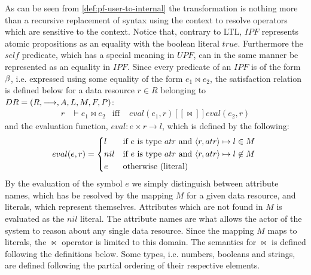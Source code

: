 As can be seen from \autoref{def:pf-user-to-internal} the transformation is nothing more than a recursive replacement of syntax using the context to resolve operators which are sensitive to the context. Notice that, contrary to LTL, $IPF$ represents atomic propositions as an equality with the boolean literal $true$. Furthermore the $self$ predicate, which has a special meaning in $UPF$, can in the same manner be represented as an equality in $IPF$. Since every predicate of an $IPF$ is of the form $\beta$, i.e. expressed using some equality of the form $e_1 \bowtie e_2$, the satisfaction relation is defined below for a data resource $r \in R$ belonging to $DR= \left( R, \longrightarrow, A, L, M, F, P \right)$:
\begin{align*}
    r &\models e_1 \bowtie e_2 &\text{iff }& eval(e_1, r) [\![ \bowtie ]\!] eval(e_2, r)
\end{align*}
and the evaluation function, $eval : e \times r \rightarrow l$, which is defined by the following:
\begin{align*}
    eval(e,r) =
    \begin{cases*}
        l   & if $e$ is type $atr$ and $\langle r,atr\rangle \mapsto l \in M$ \\
        nil & if $e$ is type $atr$ and $\langle r,atr\rangle \mapsto l \not\in M$ \\
        e         & otherwise (literal)
    \end{cases*}
\end{align*}
By the evaluation of the symbol $e$ we simply distinguish between attribute names, which has be resolved by the mapping $M$ for a given data resource, and literals, which represent themselves. Attributes which are not found in $M$ is evaluated as the $nil$ literal. The attribute names are what allows the actor of the system to reason about any single data resource. Since the mapping $M$ maps to literals, the $\bowtie$ operator is limited to this domain. The semantics for $\bowtie$ is defined following the definitions below. Some types, i.e. numbers, booleans and strings, are defined following the partial ordering of their respective elements.
